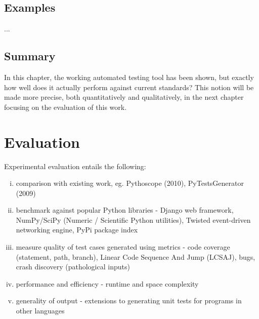 \documentclass{icldt}
\numberwithin{equation}{section}       %
\begin{document}
\section{Examples}
...
\section{Summary}
In this chapter, the working automated testing tool has been shown, but exactly how well does it actually perform against current standards? This notion will be made more precise, both quantitatively and qualitatively, in the next chapter focusing on the evaluation of this work.
\chapter{Evaluation}
\label{ch:eval}

Experimental evaluation entails the following:
\begin{enumerate}[i.]
	\item comparison with existing work, eg. Pythoscope (2010), PyTestsGenerator (2009)
	\item benchmark against popular Python libraries - Django web framework, NumPy/SciPy (Numeric / Scientific Python utilities), Twisted event-driven networking engine, PyPi package index
	\item measure quality of test cases generated using metrics - code coverage (statement, path, branch), Linear Code Sequence And Jump (LCSAJ), bugs, crash discovery (pathological inputs)
	\item performance and efficiency - runtime and space complexity
	\item generality of output - extensions to generating unit tests for programs in other languages
\end{enumerate}
\end{document}
